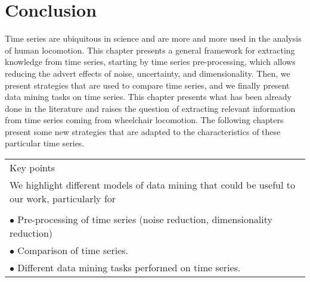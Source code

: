 \section{Conclusion}
Time series are ubiquitous in science and are more and more used in the analysis of human locomotion. This chapter presents a general framework for extracting knowledge from time series, starting by time series pre-processing, which allows reducing the advert effects of noise, uncertainty, and dimensionality. Then, we present strategies that are used to compare time series, and we finally present data mining tasks on time series. This chapter presents what has been already done in the literature and raises the question of extracting relevant information from time series coming from wheelchair locomotion. The following chapters present some new strategies that are adapted to the characteristics of these particular time series.


\begin{table}[ht]
\centering
\begin{tabular}{|p{15cm}|}

\hline
\rowcolor{LavenderBlush}
Key points\\
We highlight  different models of data mining  that could  be useful to our work, particularly for  \\
\\
$\bullet$ Pre-processing of time series (noise reduction, dimensionality reduction) \\
$\bullet$ Comparison of time series.\\ 
$\bullet$ Different data mining tasks performed on time series.\\
\hline
\end{tabular}
\end{table}
